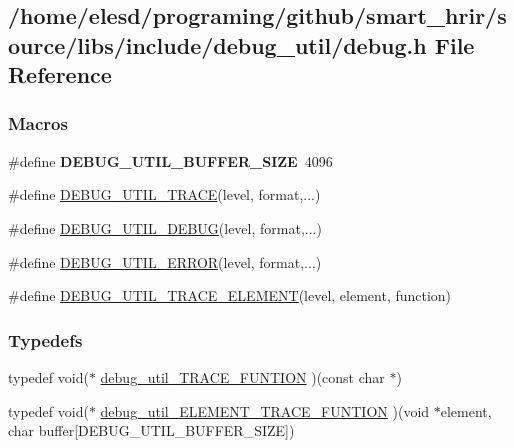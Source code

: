 \hypertarget{a00001}{\subsection{/home/elesd/programing/github/smart\-\_\-hrir/source/libs/include/debug\-\_\-util/debug.h File Reference}
\label{a00001}
}
\subsubsection*{Macros}
\begin{DoxyCompactItemize}
\item 
\hypertarget{a00001_a6157e03a309e5738d19f281c7d260b4a}{\#define {\bfseries D\-E\-B\-U\-G\-\_\-\-U\-T\-I\-L\-\_\-\-B\-U\-F\-F\-E\-R\-\_\-\-S\-I\-Z\-E}~4096}\label{a00001_a6157e03a309e5738d19f281c7d260b4a}

\item 
\#define \hyperlink{a00001_a6b158bcfd4ad0e669a9f74d0235bdc03}{D\-E\-B\-U\-G\-\_\-\-U\-T\-I\-L\-\_\-\-T\-R\-A\-C\-E}(level, format,...)
\item 
\#define \hyperlink{a00001_af4439bbbf7808aa4608088c5fc8762e6}{D\-E\-B\-U\-G\-\_\-\-U\-T\-I\-L\-\_\-\-D\-E\-B\-U\-G}(level, format,...)
\item 
\#define \hyperlink{a00001_a129eccb79d3579b55a92eeed8c6d2660}{D\-E\-B\-U\-G\-\_\-\-U\-T\-I\-L\-\_\-\-E\-R\-R\-O\-R}(level, format,...)
\item 
\#define \hyperlink{a00001_a6a89ca9ad50e359c09f5bed6858297c3}{D\-E\-B\-U\-G\-\_\-\-U\-T\-I\-L\-\_\-\-T\-R\-A\-C\-E\-\_\-\-E\-L\-E\-M\-E\-N\-T}(level, element, function)
\end{DoxyCompactItemize}
\subsubsection*{Typedefs}
\begin{DoxyCompactItemize}
\item 
typedef void($\ast$ \hyperlink{a00001_aea1a1da48f9be116b8ec308d8bc29b76}{debug\-\_\-util\-\_\-\-T\-R\-A\-C\-E\-\_\-\-F\-U\-N\-T\-I\-O\-N} )(const char $\ast$)
\item 
typedef void($\ast$ \hyperlink{a00001_acb797b3ccc582e3330d3cf3e761b3616}{debug\-\_\-util\-\_\-\-E\-L\-E\-M\-E\-N\-T\-\_\-\-T\-R\-A\-C\-E\-\_\-\-F\-U\-N\-T\-I\-O\-N} )(void $\ast$element, char buffer\mbox{[}D\-E\-B\-U\-G\-\_\-\-U\-T\-I\-L\-\_\-\-B\-U\-F\-F\-E\-R\-\_\-\-S\-I\-Z\-E\mbox{]})
\end{DoxyCompactItemize}
